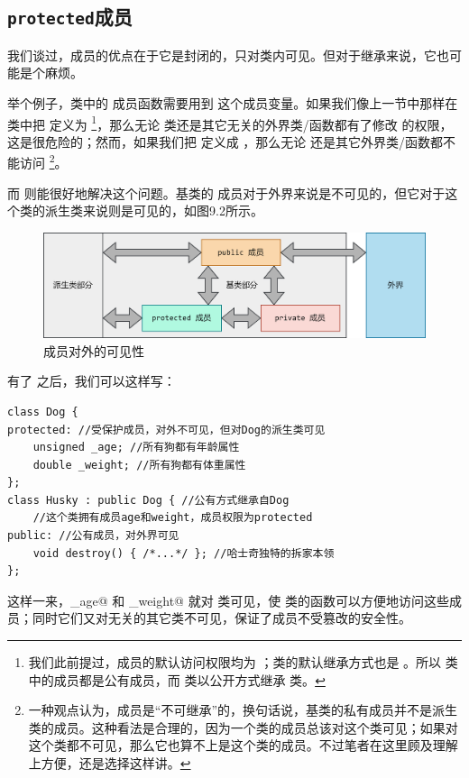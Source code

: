 \subsection*{\texttt{protected}成员}
我们谈过，\lstinline@private@ 成员的优点在于它是封闭的，只对类内可见。但对于继承来说，它也可能是个麻烦。\par
举个例子，\lstinline@Husky@ 类中的 \lstinline@destory@ 成员函数需要用到 \lstinline@weight@ 这个成员变量。如果我们像上一节中那样在 \lstinline@Dog@ 类中把 \lstinline@weight@ 定义为 \lstinline@public@\footnote{我们此前提过，\lstinline@struct@ 成员的默认访问权限均为 \lstinline@public@；\lstinline@struct@ 类的默认继承方式也是 \lstinline@public@。所以 \lstinline@Dog@ 类中的成员都是公有成员，而 \lstinline@Husky@ 类以公开方式继承 \lstinline@Dog@ 类。}，那么无论 \lstinline@Husky@ 类还是其它无关的外界类/函数都有了修改 \lstinline@weight@ 的权限，这是很危险的；然而，如果我们把 \lstinline@weight@ 定义成 \lstinline@private@，那么无论 \lstinline@Husky@ 还是其它外界类/函数都不能访问 \lstinline@weight@\footnote{一种观点认为，\lstinline@private@ 成员是``不可继承''的，换句话说，基类的私有成员并不是派生类的成员。这种看法是合理的，因为一个类的成员总该对这个类可见；如果对这个类都不可见，那么它也算不上是这个类的成员。不过笔者在这里顾及理解上方便，还是选择这样讲。}。\par
而 \lstinline@protected@ 则能很好地解决这个问题。基类的 \lstinline@protected@ 成员对于外界来说是不可见的，但它对于这个类的派生类来说则是可见的，如图9.2所示。\par
\begin{figure}[htbp]
    \centering
    \includegraphics[width=\textwidth]{../images/generalized_parts/09_protected_members_300.png}
    \caption{\lstinline@protected@ 成员对外的可见性}
\end{figure}
有了 \lstinline@protected@ 之后，我们可以这样写：
\begin{lstlisting}
class Dog {
protected: //受保护成员，对外不可见，但对Dog的派生类可见
    unsigned _age; //所有狗都有年龄属性
    double _weight; //所有狗都有体重属性
};
class Husky : public Dog { //公有方式继承自Dog
    //这个类拥有成员age和weight，成员权限为protected
public: //公有成员，对外界可见
    void destroy() { /*...*/ }; //哈士奇独特的拆家本领
};
\end{lstlisting}\par
这样一来，\lstinline@_age@ 和 \lstinline@_weight@ 就对 \lstinline@Husky@ 类可见，使 \lstinline@Husky@ 类的函数可以方便地访问这些成员；同时它们又对无关的其它类不可见，保证了成员不受篡改的安全性。\par
